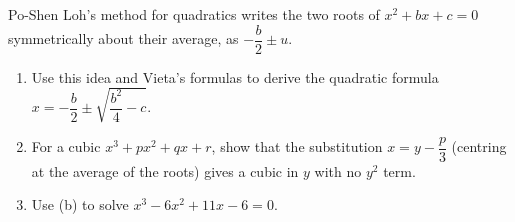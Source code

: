 Po-Shen Loh's method for quadratics writes the two roots of $x^2+bx+c=0$ symmetrically about their average, as $-\dfrac b2\pm u$.
\begin{enumerate}
\item[(a)] Use this idea and Vieta's formulas to derive the quadratic formula $x=-\dfrac b2\pm\sqrt{\dfrac{b^2}{4}-c}$.
\item[(b)] For a cubic $x^3+px^2+qx+r$, show that the substitution $x=y-\dfrac p3$ (centring at the average of the roots) gives a cubic in $y$ with no $y^2$ term.
\item[(c)] Use (b) to solve $x^3-6x^2+11x-6=0$.
\end{enumerate}
